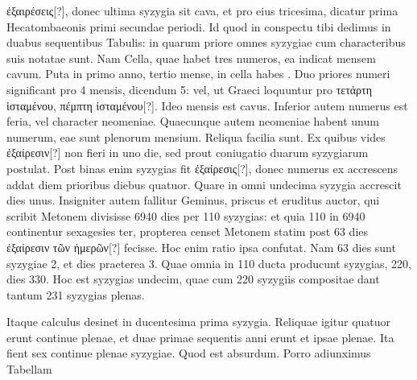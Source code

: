 \textgreek{ἐξαιρέσεις[?]}, donec ultima syzygia sit cava, et pro eius tricesima,
dicatur prima Hecatombaeonis primi secundae periodi.
Id
quod in conspectu tibi dedimus in duabus sequentibus Tabulis: in
quarum priore omnes syzygiae cum characteribus suis notatae sunt.
Nam Cella, quae habet tres numeros, ea indicat mensem cavum.
Puta in primo anno, tertio mense, in cella habes .
Duo
priores numeri significant pro 4 mensis, dicendum 5: vel, ut Graeci
loquuntur pro \textgreek{τετάρτη ἱσταμένου, πέμπτη ἱσταμένου[?]}.
Ideo mensis
est cavus.
Inferior autem numerus est feria, vel character neomeniae.
Quaecunque autem neomeniae habent unum numerum, eae
sunt plenorum mensium.
Reliqua facilia sunt.
Ex quibus vides
\textgreek{ἐξαίρεσιν[?]} non fieri in uno die,
 sed prout coniugatio duarum syzygiarum
postulat.
Post binas enim syzygias fit \textgreek{ἐξαίρεσις[?]}, donec numerus
ex  accrescens addat diem prioribus diebus quatuor.
Quare
in omni undecima syzygia accrescit dies unus.
Insigniter autem
fallitur Geminus, priscus et eruditus auctor, qui scribit Metonem
divisisse 6940 dies per 110 syzygias: et quia 110 in 6940
continentur sexagesies ter, propterea censet Metonem statim
post 63 dies \textgreek{ἐξαίρεσιν τῶν ἡμερῶν[?]} fecisse.
Hoc enim ratio ipsa confutat.
Nam 63 dies sunt syzygiae 2, et dies praeterea 3.
Quae omnia
in 110 ducta producunt syzygias, 220, dies 330.
Hoc est syzygias
undecim, quae cum 220 syzygiis compositae dant tantum 231
syzygias plenas.
\begin{table}[htbp]

\end{table}
\begin{table}[htbp]

\end{table}
\begin{table}[htbp]

\end{table}
%
Itaque calculus desinet in ducentesima prima syzygia.
Reliquae igitur
quatuor erunt continue plenae, et duae
primae sequentis anni erunt et ipsae plenae.
Ita fient sex continue plenae syzygiae.
Quod est absurdum.
Porro adiunximus Tabellam
